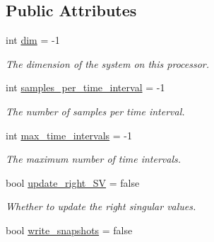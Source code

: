\subsection*{Public Attributes}
\begin{DoxyCompactItemize}
\item 
\hypertarget{class_c_a_r_o_m_1_1_options_a3dcbbe0328d917370440fe46e4079066}{int \hyperlink{class_c_a_r_o_m_1_1_options_a3dcbbe0328d917370440fe46e4079066}{dim} = -\/1}\label{class_c_a_r_o_m_1_1_options_a3dcbbe0328d917370440fe46e4079066}

\begin{DoxyCompactList}\small\item\em The dimension of the system on this processor. \end{DoxyCompactList}\item 
\hypertarget{class_c_a_r_o_m_1_1_options_a3cd57273c5f4ad1529e7bde0423905b4}{int \hyperlink{class_c_a_r_o_m_1_1_options_a3cd57273c5f4ad1529e7bde0423905b4}{samples\-\_\-per\-\_\-time\-\_\-interval} = -\/1}\label{class_c_a_r_o_m_1_1_options_a3cd57273c5f4ad1529e7bde0423905b4}

\begin{DoxyCompactList}\small\item\em The number of samples per time interval. \end{DoxyCompactList}\item 
\hypertarget{class_c_a_r_o_m_1_1_options_adbab54dd56b332ca53a07fbe86db38d8}{int \hyperlink{class_c_a_r_o_m_1_1_options_adbab54dd56b332ca53a07fbe86db38d8}{max\-\_\-time\-\_\-intervals} = -\/1}\label{class_c_a_r_o_m_1_1_options_adbab54dd56b332ca53a07fbe86db38d8}

\begin{DoxyCompactList}\small\item\em The maximum number of time intervals. \end{DoxyCompactList}\item 
\hypertarget{class_c_a_r_o_m_1_1_options_a9b8bf5620184c454562ff8a20a945455}{bool \hyperlink{class_c_a_r_o_m_1_1_options_a9b8bf5620184c454562ff8a20a945455}{update\-\_\-right\-\_\-\-S\-V} = false}\label{class_c_a_r_o_m_1_1_options_a9b8bf5620184c454562ff8a20a945455}

\begin{DoxyCompactList}\small\item\em Whether to update the right singular values. \end{DoxyCompactList}\item 
\hypertarget{class_c_a_r_o_m_1_1_options_a11c7ea4437d805fa63076ed99d77b72e}{bool \hyperlink{class_c_a_r_o_m_1_1_options_a11c7ea4437d805fa63076ed99d77b72e}{write\-\_\-snapshots} = false}\label{class_c_a_r_o_m_1_1_options_a11c7ea4437d805fa63076ed99d77b72e}


\end{DoxyCompactItemize}
